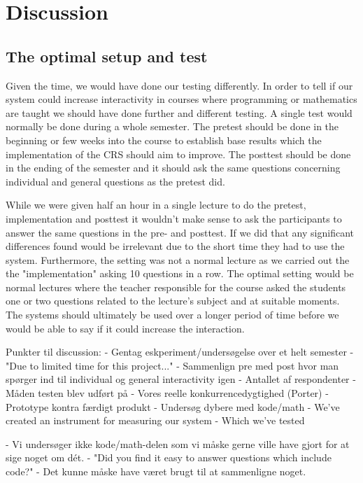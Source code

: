 \section{Discussion}

\subsection{The optimal setup and test}
Given the time, we would have done our testing differently. In order to tell if our system could increase interactivity in courses where programming or mathematics are taught we should have done further and different testing. A single test would normally be done during a whole semester. The pretest should be done in the beginning or few weeks into the course to establish base results which the implementation of the CRS should aim to improve. The posttest should be done in the ending of the semester and it should ask the same questions concerning individual and general questions as the pretest did.

While we were given half an hour in a single lecture to do the pretest, implementation and posttest it wouldn't make sense to ask the participants to answer the same questions in the pre- and posttest. If we did that any significant differences found would be irrelevant due to the short time they had to use the system. Furthermore, the setting was not a normal lecture as we carried out the the "implementation" asking 10 questions in a row. The optimal setting would be normal lectures where the teacher responsible for the course asked the students one or two questions related to the lecture's subject and at suitable moments. The systems should ultimately be used over a longer period of time before we would be able to say if it could increase the interaction.



Punkter til discussion:
- Gentag eskperiment/undersøgelse over et helt semester
	- "Due to limited time for this project..."
	- Sammenlign pre med post hvor man spørger ind til individual og general interactivity igen
- Antallet af respondenter
- Måden testen blev udført på
- Vores reelle konkurrencedygtighed (Porter)
    - Prototype kontra færdigt produkt 
- Undersøg dybere med kode/math
- We've created an instrument for measuring our system
    - Which we've tested
    

- Vi undersøger ikke kode/math-delen som vi måske gerne ville have gjort for at sige noget om dét.
    - "Did you find it easy to answer questions which include code?"
        - Det kunne måske have været brugt til at sammenligne noget.
        